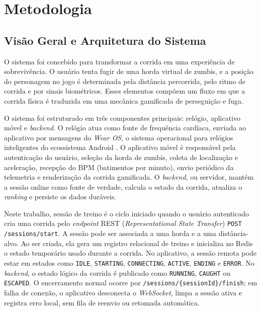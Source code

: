 \section{Metodologia}

\subsection{Visão Geral e Arquitetura do Sistema}

O sistema foi concebido para transformar a corrida em uma experiência de sobrevivência. O usuário tenta fugir de uma horda virtual de zumbis, e a posição do personagem no jogo é determinada pela distância percorrida, pelo ritmo de corrida e por sinais biométricos. Esses elementos compõem um fluxo em que a corrida física é traduzida em uma mecânica gamificada de perseguição e fuga.

O sistema foi estruturado em três componentes principais: relógio, aplicativo móvel e \textit{backend}. O relógio atua como fonte de frequência cardíaca, enviada ao aplicativo por mensagens do \textit{Wear OS}, o sistema operacional para relógios inteligentes do ecossistema Android \cite{androidWearMessageClient}. O aplicativo móvel é responsável pela autenticação do usuário, seleção da horda de zumbis, coleta de localização e aceleração, recepção do BPM (batimentos por minuto), envio periódico da telemetria e renderização da corrida gamificada. O \textit{backend}, ou servidor, mantém a sessão online como fonte de verdade, calcula o estado da corrida, atualiza o \textit{ranking} e persiste os dados duráveis.

Neste trabalho, sessão de treino é o ciclo iniciado quando o usuário autenticado cria uma corrida pelo \textit{endpoint} REST (\textit{Representational State Transfer}) \texttt{POST /sessions/start}. A sessão pode ser associada a uma horda e a uma distância-alvo. Ao ser criada, ela gera um registro relacional de treino e inicializa no Redis o estado temporário usado durante a corrida. No aplicativo, a sessão remota pode estar em estados como \texttt{IDLE}, \texttt{STARTING}, \texttt{CONNECTING}, \texttt{ACTIVE}, \texttt{ENDING} e \texttt{ERROR}. No \textit{backend}, o estado lógico da corrida é publicado como \texttt{RUNNING}, \texttt{CAUGHT} ou \texttt{ESCAPED}. O encerramento normal ocorre por \texttt{/sessions/\{sessionId\}/finish}; em falha de conexão, o aplicativo desconecta o \textit{WebSocket}, limpa a sessão ativa e registra erro local, sem fila de reenvio ou retomada automática.

